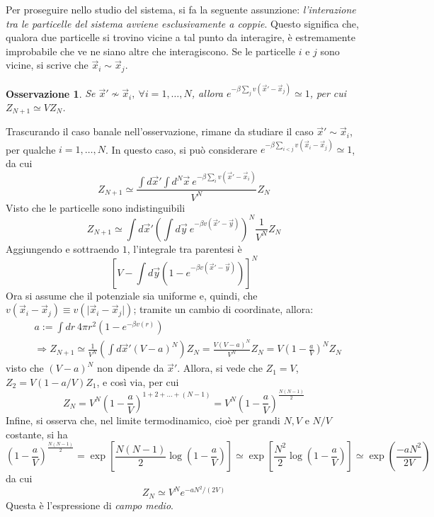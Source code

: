 \documentclass[11pt, a4paper]{scrartcl}
\theoremstyle{style}
\newtheorem{osservazione}{Osservazione}[section]
\theoremstyle{style1}
\numberwithin{equation}{subsection}
\begin{document}
Per proseguire nello studio del sistema, si fa la seguente assunzione: \textit{l'interazione tra le particelle del sistema avviene esclusivamente a coppie}. 
Questo significa che, qualora due particelle si trovino vicine a tal punto da interagire, è estremamente improbabile che ve ne siano altre che interagiscono.	
Se le particelle $i$ e $j$ sono vicine, si scrive che $\vec{x}_i \sim \vec{x}_j$.
\begin{osservazione}
	Se $\vec{x}' \not \sim \vec{x}_i, \ \forall i=1,\ldots, N$, allora $e ^{- \beta \sum_{j}^{} v(\vec{x}' - \vec{x}_j)} \simeq 1$, per cui $Z_{N+1} \simeq VZ_N$.
\end{osservazione}
\noindent Trascurando il caso banale nell'osservazione, rimane da studiare il caso $\vec{x}' \sim \vec{x}_i$, per qualche $i=1,\ldots,N$.
In questo caso, si pu\`o considerare $e^{-\beta  \sum_{i<j}^{} v (\vec{x}_i - \vec{x}_j)} \simeq 1$, da cui
\[
Z_{N+1}  \simeq \frac{\displaystyle \int d \vec{x}' \int d ^N \vec{x}\ e^{-\beta  \sum_{i}^{} v(\vec{x}' - \vec{x}_i)} }{V^N} Z_N
\] 
Visto che le particelle sono indistinguibili
\[
Z_{N+1} \simeq \int d\vec{x}' \left(\int d\vec{y} \ e ^{-\beta v(\vec{x}' -\vec{y})}\right) ^N \frac{1}{V^N}Z_N
\] 
Aggiungendo e sottraendo $1$, l'integrale tra parentesi \`e
\[
\left[ V - \int d\vec{y} \left(1 - e^{-\beta  v(\vec{x}' - \vec{y})}\right)  \right] ^N
\] 
Ora si assume che il potenziale sia uniforme e, quindi, che $v(\vec{x}_i - \vec{x}_j) \equiv v(\lvert \vec{x}_{i} -\vec{x}_j  \rvert )$; tramite un cambio di coordinate, allora:
\[
\begin{split}
	&a:= \int dr \ 4 \pi r^2 \left(1-e^{-\beta v(r)}\right) \\
	&\Rightarrow Z_{N+1} \simeq \frac{1}{V^N} \left(\int d\vec{x}' (V-a)^N\right) Z_N = \frac{V (V-a)^N}{V^N}Z_N = V \left(1-\frac{a}{V}\right) ^N Z_N
\end{split}
\] 
visto che $(V-a)^N$ non dipende da $\vec{x}'$.
Allora, si vede che $Z_1 = V$, $Z_2 = V(1-a / V)Z_1$, e cos\`i via, per cui 
\[
Z_N = V^N \left(1- \frac{a}{V}\right) ^{1 + 2 + \ldots + (N-1)} = V^N \left(1- \frac{a}{V}\right) ^{\frac{N(N-1)}{2}} 
\] 
Infine, si osserva che, nel limite termodinamico, cio\`e per grandi $N,V$ e $N / V$ costante, si ha
\[
\left(1-\frac{a}{V}\right) ^{\frac{N(N-1)}{2}} = \exp \left[ \frac{N(N-1)}{2}\log\left(1-\frac{a}{V}\right)  \right] \simeq \exp \left[ \frac{N^2}{2} \log\left(1-\frac{a}{V}\right)  \right] \simeq \exp\left(\frac{-aN^2}{2V}\right)  
\] 
da cui
\[
Z_N \simeq V^N e ^{- aN^2 / (2V)} 
\] 
Questa \`e l'espressione di \textit{campo medio}. 
\end{document}
